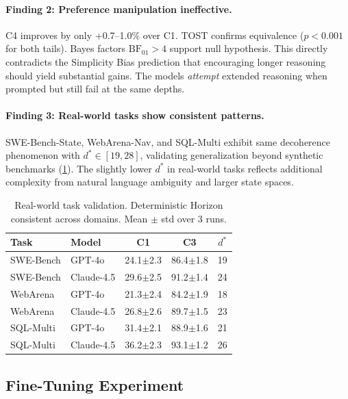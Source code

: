 \documentclass{article}
\theoremstyle{plain}
\theoremstyle{definition}
\theoremstyle{remark}
\begin{document}
\paragraph{Finding 2: Preference manipulation ineffective.} C4 improves by only +0.7--1.0\% over C1. TOST confirms equivalence ($p < 0.001$ for both tails). Bayes factors $\text{BF}_{01} > 4$ support null hypothesis. This directly contradicts the Simplicity Bias prediction that encouraging longer reasoning should yield substantial gains. The models \emph{attempt} extended reasoning when prompted but still fail at the same depths.

\paragraph{Finding 3: Real-world tasks show consistent patterns.} SWE-Bench-State, WebArena-Nav, and SQL-Multi exhibit same decoherence phenomenon with $d^* \in [19, 28]$, validating generalization beyond synthetic benchmarks (\cref{tab:realworld}). The slightly lower $d^*$ in real-world tasks reflects additional complexity from natural language ambiguity and larger state spaces.

\begin{table}[t]
\caption{Real-world task validation. Deterministic Horizon consistent across domains. Mean $\pm$ std over 3 runs.}
\label{tab:realworld}
\vskip 0.1in
\centering
\footnotesize
\begin{tabular}{@{}llccc@{}}
\toprule
\textbf{Task} & \textbf{Model} & \textbf{C1} & \textbf{C3} & \textbf{$d^*$} \\
\midrule
SWE-Bench & GPT-4o & 24.1$\pm$2.3 & 86.4$\pm$1.8 & 19 \\
SWE-Bench & Claude-4.5 & 29.6$\pm$2.5 & 91.2$\pm$1.4 & 24 \\
WebArena & GPT-4o & 21.3$\pm$2.4 & 84.2$\pm$1.9 & 18 \\
WebArena & Claude-4.5 & 26.8$\pm$2.6 & 89.7$\pm$1.5 & 23 \\
SQL-Multi & GPT-4o & 31.4$\pm$2.1 & 88.9$\pm$1.6 & 21 \\
SQL-Multi & Claude-4.5 & 36.2$\pm$2.3 & 93.1$\pm$1.2 & 26 \\
\bottomrule
\end{tabular}
\vskip -0.1in
\end{table}

\subsection{Fine-Tuning Experiment}
\label{sec:finetune}
\end{document}
